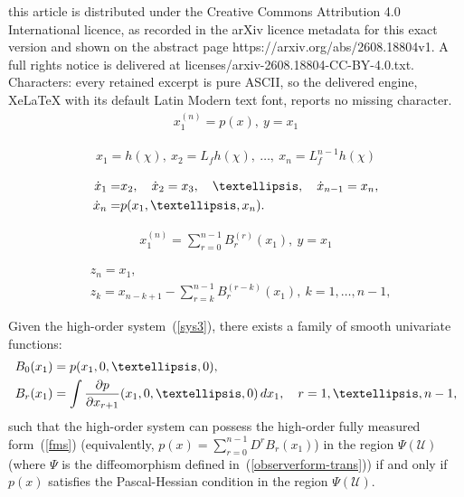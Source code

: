 \documentclass[10pt,a4paper]{amsart}
\begin{document}
this article is distributed under the Creative Commons Attribution 4.0 International licence, as recorded in the arXiv licence metadata for this exact version and shown on the abstract page https://arxiv.org/abs/2608.18804v1. A full rights notice is delivered at licenses/arxiv-2608.18804-CC-BY-4.0.txt. Characters: every retained excerpt is pure ASCII, so the delivered engine, XeLaTeX with its default Latin Modern text font, reports no missing character.
\begin{align}
	x_1^{(n)}=p(x),~y=x_1\label{sys3}
\end{align}

\begin{align}
	x_1=h(\chi),~x_2=L_fh(\chi),~\ldots,~x_n=L_f^{n-1}h(\chi)\label{observerform-trans}
\end{align} 

\begin{align}\label{eq:chain}
	\dot{x}_1 =& x_2,\quad \dot{x}_2 = x_3,\quad \ldots,\quad \dot{x}_{n-1} = x_n,\notag\\ \dot{x}_n =& p(x_1, \ldots, x_n).
\end{align}

\begin{align}
	x_1^{(n)}=\sum_{r=0}^{n-1}B_r^{(r)}(x_1),~y=x_1\label{fms}
\end{align}

\begin{align}
	&z_n=x_1,\label{transform1}\\
	&z_k=x_{n-k+1}-\sum_{r=k}^{n-1}B_r^{(r-k)}(x_1),~k=1,\ldots,n-1,\label{transform2}
\end{align}

\begin{theorem}\label{thm:PH}
	Given the high-order system~(\ref{sys3}), there exists a family of smooth univariate functions:
	\begin{align}
		B_0(x_1) &= p(x_1, 0, \ldots, 0), \label{eq:B0} \\
		B_r(x_1) &= \int \frac{\partial p}{\partial x_{r+1}}(x_1, 0, \ldots, 0) \, {\rm d}x_1,\quad r = 1, \ldots, n-1, \label{eq:Br}
	\end{align}
	such that the high-order system can possess the high-order fully measured form~(\ref{fms}) (equivalently, $p(x)=\sum_{r=0}^{n-1} D^r B_r(x_1)$) in the region $\Psi(\mathcal{U})$ (where $\Psi$ is the diffeomorphism defined in~(\ref{observerform-trans})) if and only if $p(x)$ satisfies the Pascal-Hessian condition in the region $\Psi(\mathcal{U})$. 
\end{theorem}
\end{document}
